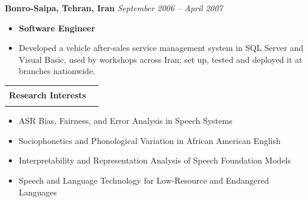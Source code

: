 \documentclass[11pt,a4paper]{article}
\makeatletter
\newcommand{\inlinesection}[1]{%
  \vspace{1em}
  \noindent
  \begin{tabular*}{\linewidth}{@{}l@{\extracolsep{\fill}}r@{}}
    \Large\textbf{\color{darkblue} #1} & \color{darkblue}\rule{0.7\linewidth}{1.2pt} \\
  \end{tabular*}
  \par\vspace{0.7em}
}
\makeatother
\begin{document}
\begin{list}{}{
  \setlength{\leftmargin}{0pt}
  \setlength{\labelwidth}{0pt}
  \setlength{\itemindent}{0pt}
  \setlength{\parsep}{0pt}
  \setlength{\itemsep}{1em}
}
\item \textcolor{RedViolet}{\textbf{Bonro-Saipa, Tehran, Iran} \hfill \textit{September 2006 – April 2007}} \vspace{0.5em}
      \begin{itemize}
          \item \textbf{Software Engineer}
          \item Developed a vehicle after-sales service management system in SQL Server and Visual Basic, used by workshops across Iran; set up, tested and deployed it at branches nationwide.
      \end{itemize}
\end{list}
\inlinesection{Research Interests}
\begin{itemize}
    \item ASR Bias, Fairness, and Error Analysis in Speech Systems
    \item Sociophonetics and Phonological Variation in African American English
    \item Interpretability and Representation Analysis of Speech Foundation Models
    \item Speech and Language Technology for Low-Resource and Endangered Languages
\end{itemize}
\end{document}
